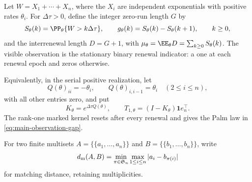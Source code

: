 Let \(W=X_1+\cdots+X_n\), where the \(X_i\) are independent exponentials
with positive rates \(\theta_i\).  For \(\Delta\tau>0\), define the
integer zero-run length \(G\) by
\begin{equation}
 S_\theta(k)=\PP_\theta\{W>k\Delta\tau\},\qquad
 g_\theta(k)=S_\theta(k)-S_\theta(k+1),\qquad k\ge0,
\label{eq:main-observation-gap}
\end{equation}
and the interrenewal length \(D=G+1\), with
\(\mu_\theta=\EE_\theta D=\sum_{k\ge0}S_\theta(k)\).
The visible observation is the stationary binary renewal indicator: a one at
each renewal epoch and zeros otherwise.

Equivalently, in the serial positive realization, let
\begin{equation}
 Q(\theta)_{ii}=-\theta_i,\qquad
 Q(\theta)_{i,i-1}=\theta_i\quad(2\le i\le n),
\label{eq:main-killed-generator}
\end{equation}
with all other entries zero, and put
\begin{equation}
 K_\theta=e^{\Delta\tau Q(\theta)},\qquad
 T_{1,\theta}=(I-K_\theta)\mathbf1e_n^\top.
\label{eq:main-killed-kernel}
\end{equation}
The rank-one marked kernel resets after every renewal and gives the Palm law
in \eqref{eq:main-observation-gap}.

For two finite multisets \(A=\{\!\{a_1,\ldots,a_n\}\!\}\) and
\(B=\{\!\{b_1,\ldots,b_n\}\!\}\), write
\begin{equation}
 d_{\rm m}(A,B)=\min_{\pi\in\mathfrak S_n}
 \max_{1\le i\le n}|a_i-b_{\pi(i)}|
\label{eq:main-matching-distance}
\end{equation}
for matching distance, retaining multiplicities.
